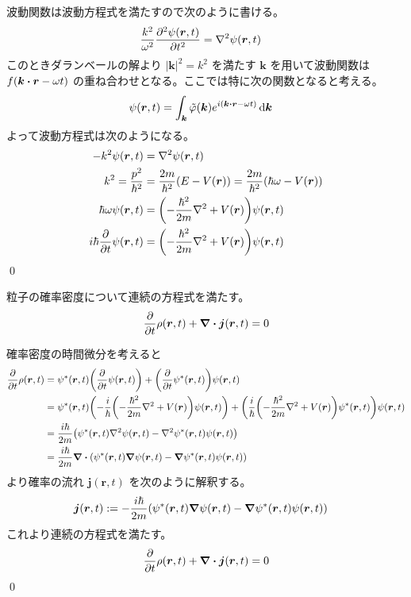 \documentclass[uplatex,dvipdfmx,a4paper,11pt]{jlreq}
\makeatletter
\newcommand{\rr}{\bm{r}}
\newcommand{\kk}{\bm{k}}
\theoremstyle{definition}
\renewenvironment{proof}[1][\proofname]{\par
  \normalfont
  \topsep6\p@\@plus6\p@ \trivlist
  \item[\hskip\labelsep{\bfseries #1}\@addpunct{\bfseries}]\ignorespaces\quad\par
}{%
  \qed\endtrivlist\@endpefalse
}
\renewcommand\proofname{証明}
\makeatother
\begin{document}
\begin{proof}
  波動関数は波動方程式を満たすので次のように書ける。
  \begin{align}
    \frac{k^2}{\omega^2}\pdv[2]{\psi(\rr, t)}{t} & = \nabla^2\psi(\rr, t)
  \end{align}
  このときダランベールの解より $|\kk|^2 = k^2$ を満たす $\kk$ を用いて波動関数は $f(\kk\vdot\rr - \omega t)$ の重ね合わせとなる。ここでは特に次の関数となると考える。
  \begin{align}
    \psi(\rr, t) & = \int_{\kk}\tilde{\varphi}(\kk)e^{i(\kk\vdot\rr - \omega t)}\dd{\kk}
  \end{align}
  よって波動方程式は次のようになる。
  \begin{align}
    -k^2\psi(\rr, t)          & = \nabla^2\psi(\rr, t)                                                      \\
    k^2 = \frac{p^2}{\hbar^2} & = \frac{2m}{\hbar^2}(E - V(\rr)) = \frac{2m}{\hbar^2}(\hbar\omega - V(\rr)) \\
    \hbar\omega\psi(\rr, t)   & = \qty(-\frac{\hbar^2}{2m}\nabla^2 + V(\rr))\psi(\rr, t)                    \\
    i\hbar\pdv{t}\psi(\rr, t) & = \qty(-\frac{\hbar^2}{2m}\nabla^2 + V(\rr))\psi(\rr, t)
  \end{align}
\end{proof}
\begin{theorem}
  粒子の確率密度について連続の方程式を満たす。
  \begin{align}
    \pdv{t}\rho(\rr, t) + \vnabla\vdot\bm{j}(\rr, t) = 0
  \end{align}
\end{theorem}
\begin{proof}
  確率密度の時間微分を考えると
  \begin{align}
    \pdv{t}\rho(\rr, t) & = \psi^*(\rr, t)\qty(\pdv{t}\psi(\rr, t)) + \qty(\pdv{t}\psi^*(\rr, t))\psi(\rr, t)                                                                                                      \\
                        & = \psi^*(\rr, t)\qty(-\frac{i}{\hbar}\qty(-\frac{\hbar^2}{2m}\nabla^2 + V(\rr))\psi(\rr, t)) + \qty(\frac{i}{\hbar}\qty(-\frac{\hbar^2}{2m}\nabla^2 + V(\rr))\psi^*(\rr, t))\psi(\rr, t) \\
                        & = \frac{i\hbar}{2m}\qty(\psi^*(\rr, t)\nabla^2\psi(\rr, t) - \nabla^2\psi^*(\rr, t)\psi(\rr, t))                                                                                         \\
                        & = \frac{i\hbar}{2m}\vnabla\vdot\qty(\psi^*(\rr, t)\vnabla\psi(\rr, t) - \vnabla\psi^*(\rr, t)\psi(\rr, t))
  \end{align}
  より確率の流れ $\bm{j}(\rr, t)$ を次のように解釈する。
  \begin{align}
    \bm{j}(\rr, t) & := -\frac{i\hbar}{2m}\qty(\psi^*(\rr, t)\vnabla\psi(\rr, t) - \vnabla\psi^*(\rr, t)\psi(\rr, t))
  \end{align}
  これより連続の方程式を満たす。
  \begin{align}
    \pdv{t}\rho(\rr, t) + \vnabla\vdot\bm{j}(\rr, t) = 0
  \end{align}
\end{proof}
\end{document}
